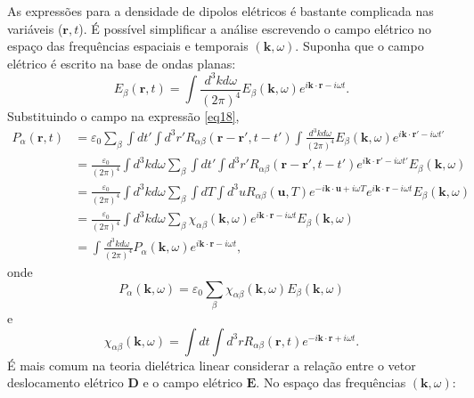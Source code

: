 \documentclass{article}
\begin{document}
As expressões para a densidade de dipolos elétricos é bastante complicada nas variáveis ($\mathbf{r},t$). É possível simplificar a análise escrevendo o campo elétrico no espaço das frequências espaciais e temporais $(\mathbf{k},\omega)$. Suponha que o campo elétrico é escrito na base de ondas planas:
\begin{equation}
    E_{\beta} (\mathbf{r},t) = \int \frac{d^3 k d\omega}{(2\pi)^4} E_{\beta}(\mathbf{k},\omega)e^{i\mathbf{k}\cdot\mathbf{r}-i\omega t}.
\end{equation}
Substituindo o campo na expressão \eqref{eq18},
\begin{equation}
\begin{split}
P_{\alpha}(\mathbf{r},t) & = \varepsilon_0 \sum_{\beta}\int dt' \int d^{3}r' R_{\alpha\beta}(\mathbf{r}-\mathbf{r}',t-t')\int \frac{d^3 k d\omega}{(2\pi)^4} E_{\beta}(\mathbf{k},\omega)e^{i\mathbf{k}\cdot\mathbf{r}'-i\omega t'}\\ 
&= \frac{\varepsilon_0}{(2\pi)^4}\int d^3 k d\omega \sum_{\beta}\int dt' \int d^{3}r' R_{\alpha\beta}(\mathbf{r}-\mathbf{r}',t-t') e^{i\mathbf{k}\cdot\mathbf{r}'-i\omega t'}E_{\beta}(\mathbf{k},\omega) \\
&= \frac{\varepsilon_0}{(2\pi)^4}\int d^3 k d\omega \sum_{\beta}\int dT \int d^{3}u R_{\alpha\beta}(\mathbf{u},T) e^{-i\mathbf{k}\cdot\mathbf{u}+i\omega T}e^{i\mathbf{k}\cdot\mathbf{r}-i\omega t}E_{\beta}(\mathbf{k},\omega) \\
&= \frac{\varepsilon_0}{(2\pi)^4}\int d^3 k d\omega \sum_{\beta}\chi_{\alpha\beta}(\mathbf{k},\omega)e^{i\mathbf{k}\cdot\mathbf{r}-i\omega t}E_{\beta}(\mathbf{k},\omega) \\
&= \int \frac{d^3 k d\omega}{(2\pi)^4} P_{\alpha}(\mathbf{k},\omega)e^{i\mathbf{k}\cdot\mathbf{r}-i\omega t},
\end{split}
\end{equation}
onde
\begin{equation}
    P_\alpha (\mathbf{k},\omega) = \varepsilon_0 \sum_\beta \chi_{\alpha\beta}(\mathbf{k},\omega)E_\beta (\mathbf{k},\omega)
\end{equation}
e
\begin{equation}
    \chi_{\alpha\beta}(\mathbf{k},\omega) = \int dt \int d^{3}r R_{\alpha\beta}(\mathbf{r},t) e^{-i\mathbf{k}\cdot\mathbf{r}+i\omega t}.
\end{equation}
É mais comum na teoria dielétrica linear considerar a relação entre o vetor deslocamento elétrico $\mathbf{D}$ e o campo elétrico $\mathbf{E}$. No espaço das frequências $(\mathbf{k},\omega)$:
\end{document}
